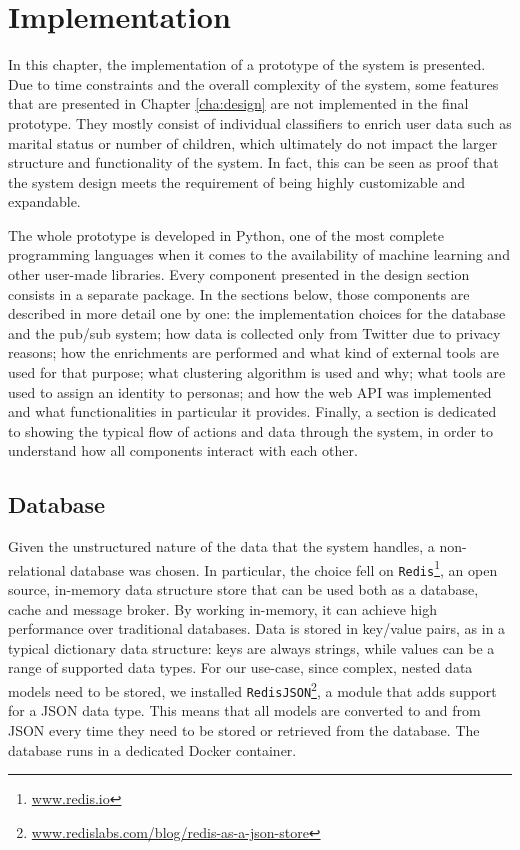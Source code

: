 \chapter{Implementation}
\label{cha:implementation}
In this chapter, the implementation of a prototype of the system is presented. Due to time constraints and the overall complexity of the system, some features that are presented in Chapter \ref{cha:design} are not implemented in the final prototype. They mostly consist of individual classifiers to enrich user data such as marital status or number of children, which ultimately do not impact the larger structure and functionality of the system. In fact, this can be seen as proof that the system design meets the requirement of being highly customizable and expandable.

The whole prototype is developed in Python, one of the most complete programming languages when it comes to the availability of machine learning and other user-made libraries. Every component presented in the design section consists in a separate package. In the sections below, those components are described in more detail one by one: the implementation choices for the database and the pub/sub system; how data is collected only from Twitter due to privacy reasons; how the enrichments are performed and what kind of external tools are used for that purpose; what clustering algorithm is used and why; what tools are used to assign an identity to personas; and how the web API was implemented and what functionalities in particular it provides. Finally, a section is dedicated to showing the typical flow of actions and data through the system, in order to understand how all components interact with each other.

\section{Database}
Given the unstructured nature of the data that the system handles, a non-relational database was chosen. In particular, the choice fell on \texttt{Redis}\footnote{\url{www.redis.io}}, an open source, in-memory data structure store that can be used both as a database, cache and message broker. By working in-memory, it can achieve high performance over traditional databases. Data is stored in key/value pairs, as in a typical dictionary data structure: keys are always strings, while values can be a range of supported data types. For our use-case, since complex, nested data models need to be stored, we installed \texttt{RedisJSON}\footnote{\url{www.redislabs.com/blog/redis-as-a-json-store}}, a module that adds support for a JSON data type. This means that all models are converted to and from JSON every time they need to be stored or retrieved from the database. The database runs in a dedicated Docker container.

